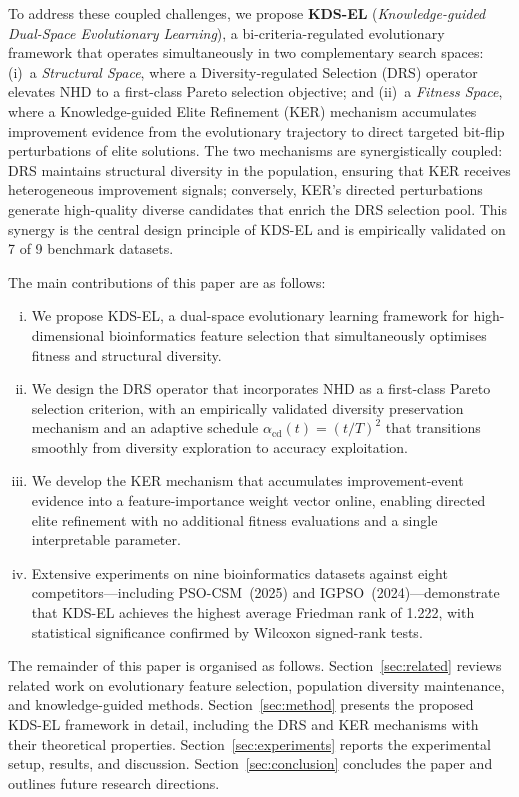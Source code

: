 \documentclass[a4paper,fleqn]{cas-dc}
\begin{document}
\begin{sloppypar}
	\par{
	To address these coupled challenges, we propose \textbf{KDS-EL}
	(\textit{Knowledge-guided Dual-Space Evolutionary Learning}),
	a bi-criteria-regulated evolutionary framework that operates
	simultaneously in two complementary search spaces:
	(i)~a \emph{Structural Space}, where a Diversity-regulated Selection
	(DRS) operator elevates NHD to a first-class Pareto selection
	objective; and
	(ii)~a \emph{Fitness Space}, where a Knowledge-guided Elite
	Refinement (KER) mechanism accumulates improvement evidence from
	the evolutionary trajectory to direct targeted bit-flip
	perturbations of elite solutions.
	The two mechanisms are synergistically coupled: DRS maintains
	structural diversity in the population, ensuring that KER receives
	heterogeneous improvement signals; conversely, KER's directed
	perturbations generate high-quality diverse candidates that enrich
	the DRS selection pool.
	This synergy is the central design principle of KDS-EL and is
	empirically validated on 7 of 9 benchmark datasets.
	}

	\par{
	The main contributions of this paper are as follows:
	\begin{enumerate}[(i)]
		\item We propose KDS-EL, a dual-space evolutionary learning
		framework for high-dimensional bioinformatics feature selection
		that simultaneously optimises fitness and structural diversity.
		\item We design the DRS operator that incorporates NHD as a
		first-class Pareto selection criterion, with an empirically
		validated diversity preservation mechanism and an adaptive schedule $\alpha_{\mathrm{cd}}(t)=(t/T)^2$
		that transitions smoothly from diversity exploration to accuracy
		exploitation.
		\item We develop the KER mechanism that accumulates
		improvement-event evidence into a feature-importance weight
		vector online, enabling directed elite refinement with no
		additional fitness evaluations and a single interpretable
		parameter.
		\item Extensive experiments on nine bioinformatics datasets
		against eight competitors---including PSO-CSM~(2025) and
		IGPSO~(2024)---demonstrate that KDS-EL achieves the highest
		average Friedman rank of 1.222, with statistical significance
		confirmed by Wilcoxon signed-rank tests.
	\end{enumerate}
	}

	\par{
	The remainder of this paper is organised as follows.
	Section~\ref{sec:related} reviews related work on evolutionary
	feature selection, population diversity maintenance, and
	knowledge-guided methods.
	Section~\ref{sec:method} presents the proposed KDS-EL framework
	in detail, including the DRS and KER mechanisms with their
	theoretical properties.
	Section~\ref{sec:experiments} reports the experimental setup,
	results, and discussion.
	Section~\ref{sec:conclusion} concludes the paper and outlines
	future research directions.
	}


\end{sloppypar}
\end{document}

